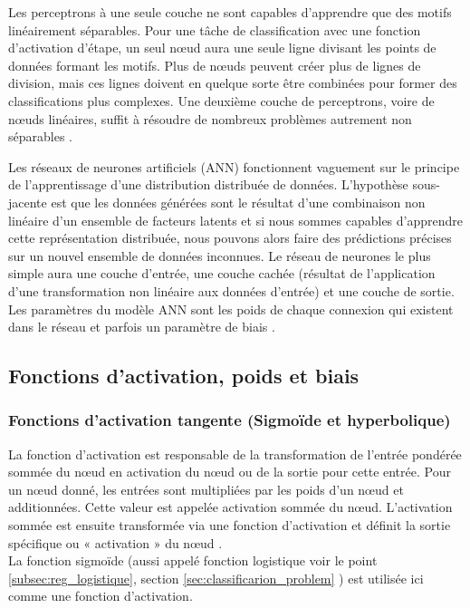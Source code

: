 	Les perceptrons à une seule couche ne sont capables d'apprendre que des motifs linéairement séparables. Pour une tâche de classification avec une fonction d'activation d'étape, un seul nœud aura une seule ligne divisant les points de données formant les motifs. Plus de nœuds peuvent créer plus de lignes de division, mais ces lignes doivent en quelque sorte être combinées pour former des classifications plus complexes. Une deuxième couche de perceptrons, voire de nœuds linéaires, suffit à résoudre de nombreux problèmes autrement non séparables \cite{antoine2018apprentissage}.
	
	Les réseaux de neurones artificiels (ANN) fonctionnent vaguement sur le principe de l'apprentissage d'une distribution distribuée de données.
	L'hypothèse sous-jacente est que les données générées sont le résultat d'une combinaison non linéaire d'un ensemble de facteurs latents et si nous sommes capables d'apprendre cette représentation distribuée, nous pouvons alors faire des prédictions précises sur un nouvel ensemble de données inconnues. Le réseau de neurones le plus simple aura une couche d'entrée, une couche cachée (résultat de l'application d'une transformation non linéaire aux données d'entrée) et une couche de sortie. Les paramètres du modèle ANN sont les poids de chaque connexion qui existent dans le réseau et parfois un paramètre de biais \cite{sarkar2017practical}.
	
	
	
	\subsection{Fonctions d'activation, poids et biais} \label{sec:activation_weight}
	
	
	\subsubsection{Fonctions d'activation tangente (Sigmoïde et  hyperbolique)}
	La fonction d'activation est responsable de la transformation de l'entrée pondérée sommée du nœud en activation du nœud ou de la sortie pour cette entrée.
	Pour un nœud donné, les entrées sont multipliées par les poids d'un nœud et additionnées. Cette valeur est appelée activation sommée du nœud. L'activation sommée est ensuite transformée via une fonction d'activation et définit la sortie spécifique ou « activation » du nœud \cite{ml2008python}.\\
	La fonction sigmoïde (aussi appelé fonction logistique voir le point \ref{subsec:reg_logistique}, section \ref{sec:classificarion_problem} ) est utilisée ici comme une fonction d'activation.	
	
